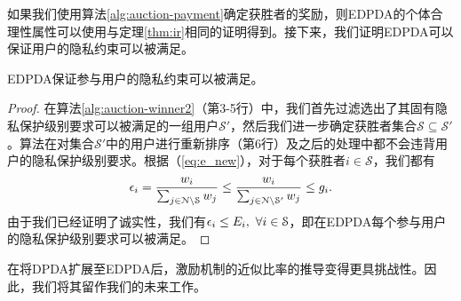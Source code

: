 	如果我们使用算法\ref{alg:auction-payment}确定获胜者的奖励，则EDPDA的个体合理性属性可以使用与定理\ref{thm:ir}相同的证明得到。接下来，我们证明EDPDA可以保证用户的隐私约束可以被满足。
	
	\begin{thm}
		EDP​​DA保证参与用户的隐私约束可以被满足。
	\end{thm} 
	\begin{proof}
		在算法\ref{alg:auction-winner2}（第3-5行）中，我们首先过滤选出了其固有隐私保护级别要求可以被满足的一组用户$\mathcal{S}'$，然后我们进一步确定获胜者集合$\mathcal{S}\subseteq\mathcal{S}'$。算法在对集合$\mathcal{S}'$中的用户进行重新排序（第6行）及之后的处理中都不会违背用户的隐私保护级别要求。根据（\ref{eq:e_new}），对于每个获胜者$i\in\mathcal{S}$，我们都有\[\epsilon_i=\frac{w_i}{\sum_{j\in\mathcal{N}\backslash\mathcal{S}}w_j}\leq\frac{w_i}{\sum_{j\in\mathcal{N}\backslash\mathcal{S}'}w_j}\leq g_i.\]由于我们已经证明了诚实性，我们有$\epsilon_i\leq E_i,~\forall i\in\mathcal{S}$，即在EDPDA每个参与用户的隐私保护级别要求可以被满足。
	\end{proof}
	
	

	在将DPDA扩展至EDPDA后，激励机制的近似比率的推导变得更具挑战性。因此，我们将其留作我们的未来工作。

